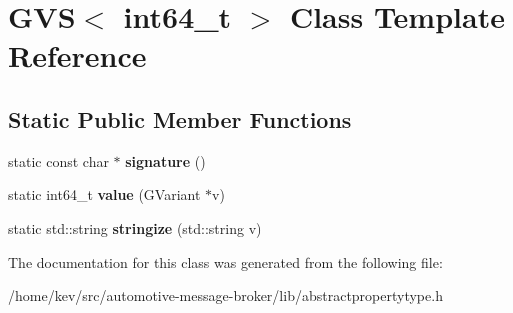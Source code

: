 \hypertarget{classGVS_3_01int64__t_01_4}{\section{G\-V\-S$<$ int64\-\_\-t $>$ Class Template Reference}
\label{classGVS_3_01int64__t_01_4}
}
\subsection*{Static Public Member Functions}
\begin{DoxyCompactItemize}
\item 
\hypertarget{classGVS_3_01int64__t_01_4_a1dc54b2dda69355ec6c037fe0ee28a68}{static const char $\ast$ {\bfseries signature} ()}\label{classGVS_3_01int64__t_01_4_a1dc54b2dda69355ec6c037fe0ee28a68}

\item 
\hypertarget{classGVS_3_01int64__t_01_4_a08ab99b0ab505b2d29e4e954e91f75e0}{static int64\-\_\-t {\bfseries value} (G\-Variant $\ast$v)}\label{classGVS_3_01int64__t_01_4_a08ab99b0ab505b2d29e4e954e91f75e0}

\item 
\hypertarget{classGVS_3_01int64__t_01_4_a66197d92e5c517a97326ccff42e338bb}{static std\-::string {\bfseries stringize} (std\-::string v)}\label{classGVS_3_01int64__t_01_4_a66197d92e5c517a97326ccff42e338bb}

\end{DoxyCompactItemize}


The documentation for this class was generated from the following file\-:\begin{DoxyCompactItemize}
\item 
/home/kev/src/automotive-\/message-\/broker/lib/abstractpropertytype.\-h\end{DoxyCompactItemize}
